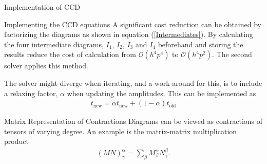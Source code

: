 \documentclass[twoside,english]{uiofysmaster}
\begin{document}
\begin{chapter}{Implementation of CCD}
\begin{section}{Implementing the CCD equations}
		A significant cost reduction can be obtained by
                factorizing the diagrams as shown in equation
                (\ref{Intermediates}). By calculating the four
                intermediate diagrams, $I_1$, $I_2$, $I_3$ and $I_4$
                beforehand and storing the results reduce the cost of
                calculation from $\mathcal{O}(h^4 p^4)$ to
                $\mathcal{O}(h^4 p^2)$. The second solver applies this
                method.

                The solver might diverge when iterating, and a work-around for this, is to include a relaxing factor, $\alpha$ when updating the amplitudes. This can be implemented as
                \begin{align}
                  t_{\text{new}} = \alpha t_{\text{new}} + (1-\alpha) t_{\text{old}}
                \end{align}

	\end{section}

	\begin{section}{Matrix Representation of Contractions}
		Diagrams can be viewed as contractions of tensors of
                varying degree. An example is the matrix-matrix
                multiplication product
		\begin{align}
		 	\left( M N \right)_{\gamma}^{\alpha} = \sum_{\beta} M_{\beta}^\alpha N_\gamma^\beta .
		 	\label{matrix matrix multiplication}
		\end{align} 


\end{section}
\end{chapter}
\end{document}
